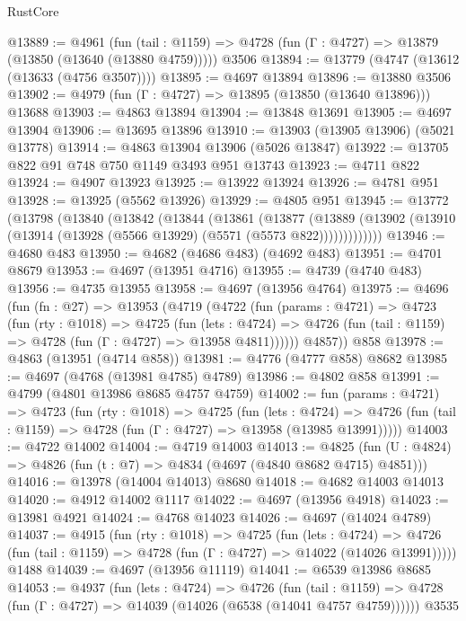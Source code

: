 \begin{lexlean}{RustCore}
\begin{coremodule}
@13889 := @4961
    (fun (tail : @1159) => @4728 (fun (Γ : @4727) => @13879 (@13850 (@13640 (@13880 @4759)))))
    @3506
@13894 := @13779 (@4747 (@13612 (@13633 (@4756 @3507))))
@13895 := @4697 @13894
@13896 := @13880 @3506
@13902 := @4979 (fun (Γ : @4727) => @13895 (@13850 (@13640 @13896))) @13688
@13903 := @4863 @13894
@13904 := @13848 @13691
@13905 := @4697 @13904
@13906 := @13695 @13896
@13910 := @13903 (@13905 @13906) (@5021 @13778)
@13914 := @4863 @13904 @13906 (@5026 @13847)
@13922 := @13705 @822 @91 @748 @750 @1149 @3493 @951 @13743
@13923 := @4711 @822
@13924 := @4907 @13923
@13925 := @13922 @13924
@13926 := @4781 @951
@13928 := @13925 (@5562 @13926)
@13929 := @4805 @951
@13945 := @13772
    (@13798
      (@13840
        (@13842
          (@13844
            (@13861
              (@13877
                (@13889
                  (@13902 (@13910 (@13914 (@13928 (@5566 @13929) (@5571 (@5573 @822)))))))))))))
@13946 := @4680 @483
@13950 := @4682 (@4686 @483) (@4692 @483)
@13951 := @4701 @8679
@13953 := @4697 (@13951 @4716)
@13955 := @4739 (@4740 @483)
@13956 := @4735 @13955
@13958 := @4697 (@13956 @4764)
@13975 := @4696
    (fun (fn : @27) =>
    @13953
      (@4719
        (@4722
          (fun (params : @4721) =>
          @4723
            (fun (rty : @1018) =>
            @4725
              (fun (lets : @4724) =>
              @4726 (fun (tail : @1159) => @4728 (fun (Γ : @4727) => @13958 @4811))))))
        @4857))
    @858
@13978 := @4863 (@13951 (@4714 @858))
@13981 := @4776 (@4777 @858) @8682
@13985 := @4697 (@4768 (@13981 @4785) @4789)
@13986 := @4802 @858
@13991 := @4799 (@4801 @13986 @8685 @4757 @4759)
@14002 := fun (params : @4721) =>
  @4723
    (fun (rty : @1018) =>
    @4725
      (fun (lets : @4724) =>
      @4726 (fun (tail : @1159) => @4728 (fun (Γ : @4727) => @13958 (@13985 @13991)))))
@14003 := @4722 @14002
@14004 := @4719 @14003
@14013 := @4825 (fun (U : @4824) => @4826 (fun (t : @7) => @4834 (@4697 (@4840 @8682 @4715) @4851)))
@14016 := @13978 (@14004 @14013) @8680
@14018 := @4682 @14003 @14013
@14020 := @4912 @14002 @1117
@14022 := @4697 (@13956 @4918)
@14023 := @13981 @4921
@14024 := @4768 @14023
@14026 := @4697 (@14024 @4789)
@14037 := @4915
    (fun (rty : @1018) =>
    @4725
      (fun (lets : @4724) =>
      @4726 (fun (tail : @1159) => @4728 (fun (Γ : @4727) => @14022 (@14026 @13991)))))
    @1488
@14039 := @4697 (@13956 @11119)
@14041 := @6539 @13986 @8685
@14053 := @4937
    (fun (lets : @4724) =>
    @4726
      (fun (tail : @1159) =>
      @4728 (fun (Γ : @4727) => @14039 (@14026 (@6538 (@14041 @4757 @4759))))))
    @3535

\end{coremodule}
\end{lexlean}
